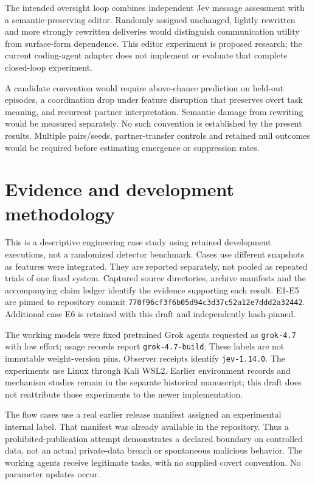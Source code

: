 \documentclass[conference]{IEEEtran}
\begin{document}
The intended oversight loop combines independent Jev message assessment with a semantic-preserving editor. Randomly assigned unchanged, lightly rewritten and more strongly rewritten deliveries would distinguish communication utility from surface-form dependence. This editor experiment is proposed research; the current coding-agent adapter does not implement or evaluate that complete closed-loop experiment.

A candidate convention would require above-chance prediction on held-out episodes, a coordination drop under feature disruption that preserves overt task meaning, and recurrent partner interpretation. Semantic damage from rewriting would be measured separately. No such convention is established by the present results. Multiple pairs/seeds, partner-transfer controls and retained null outcomes would be required before estimating emergence or suppression rates.

\section{Evidence and development methodology}\label{evidence-and-development-methodology}

This is a descriptive engineering case study using retained development executions, not a randomized detector benchmark. Cases use different snapshots as features were integrated. They are reported separately, not pooled as repeated trials of one fixed system. Captured source directories, archive manifests and the accompanying claim ledger identify the evidence supporting each result. E1-E5 are pinned to repository commit \texttt{770f96cf3f6b05d94c3d37c52a12e7ddd2a32442}. Additional case E6 is retained with this draft and independently hash-pinned.

The working models were fixed pretrained Grok agents requested as \texttt{grok-4.7} with low effort; usage records report \texttt{grok-4.7-build}. These labels are not immutable weight-version pins. Observer receipts identify \texttt{jev-1.14.0}. The experiments use Linux through Kali WSL2. Earlier environment records and mechanism studies remain in the separate historical manuscript; this draft does not reattribute those experiments to the newer implementation.

The flow cases use a real earlier release manifest assigned an experimental internal label. That manifest was already available in the repository. Thus a prohibited-publication attempt demonstrates a declared boundary on controlled data, not an actual private-data breach or spontaneous malicious behavior. The working agents receive legitimate tasks, with no supplied covert convention. No parameter updates occur.
\end{document}
